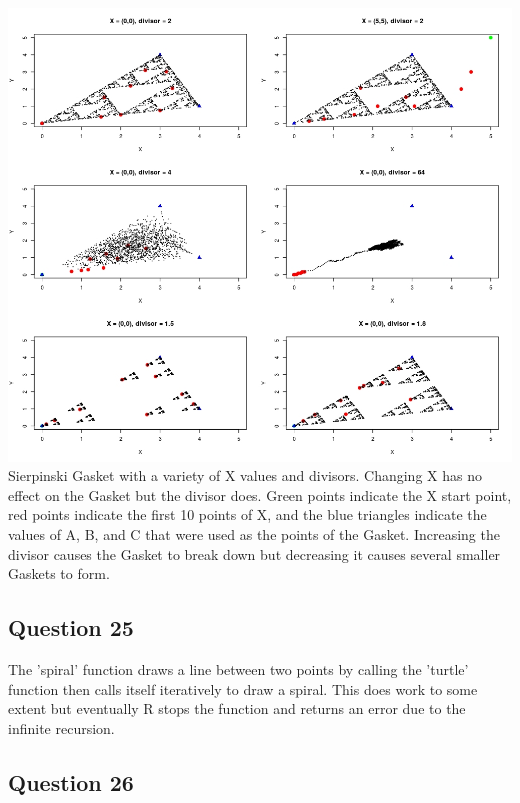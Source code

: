 \documentclass{article}
\begin{document}
\begin{center}
  \includegraphics[width=\textwidth]{../Results/challenge_E.jpeg}
   {Sierpinski Gasket with a variety of X values and divisors. Changing X has no effect
  on the Gasket but the divisor does. Green points indicate the X start point, red points indicate 
  the first 10 points of X, and the blue triangles indicate the values of A, B, and C that were used as the 
  points of the Gasket. Increasing the divisor causes the Gasket to break down but decreasing it causes several
  smaller Gaskets to form.}
\end{center}

\break

\subsection*{Question 25}
The 'spiral' function draws a line between two points by calling the 'turtle'
function then calls itself iteratively to draw a spiral. This does work to some extent but 
eventually R stops the function and returns an error due to the infinite recursion.
\bigskip

\subsection*{Question 26}
\end{document}
